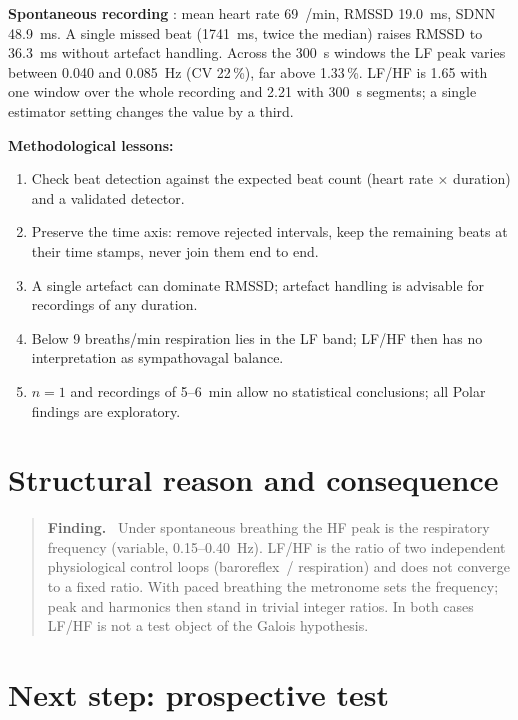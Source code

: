 \textbf{Spontaneous recording} \KM: mean heart rate 69~/min, RMSSD
19.0~ms, SDNN 48.9~ms. A single missed beat (1741~ms, twice the median)
raises RMSSD to 36.3~ms without artefact handling. Across the 300~s
windows the LF peak varies between 0.040 and 0.085~Hz (CV 22\,\%), far
above 1.33\,\%. LF/HF is 1.65 with one window over the whole recording and
2.21 with 300~s segments; a single estimator setting changes the value by
a third.

\textbf{Methodological lessons:}
\begin{enumerate}
\item Check beat detection against the expected beat count
  (heart rate $\times$ duration) and a validated detector.
\item Preserve the time axis: remove rejected intervals, keep the
  remaining beats at their time stamps, never join them end to end.
\item A single artefact can dominate RMSSD; artefact handling is
  advisable for recordings of any duration.
\item Below 9 breaths/min respiration lies in the LF band; LF/HF then has
  no interpretation as sympathovagal balance.
\item $n=1$ and recordings of 5--6~min allow no statistical conclusions;
  all Polar findings are exploratory.
\end{enumerate}

\section{Structural reason and consequence}

\begin{quote}
\textbf{Finding.} \BM\ Under spontaneous breathing the HF peak is the
respiratory frequency (variable, 0.15--0.40~Hz). LF/HF is the ratio of
two independent physiological control loops (baroreflex~/ respiration)
and does not converge to a fixed ratio. With paced breathing the
metronome sets the frequency; peak and harmonics then stand in trivial
integer ratios. In both cases LF/HF is not a test object of the Galois
hypothesis.
\end{quote}

\section{Next step: prospective test}\label{sec:360next}

